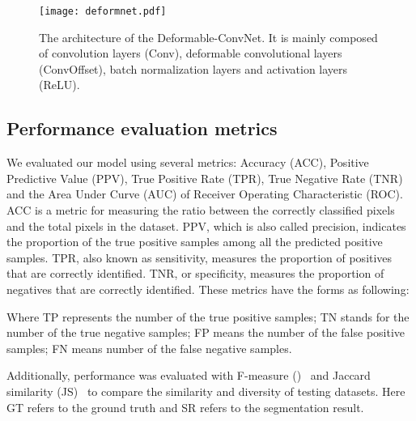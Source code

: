 \documentclass[journal]{IEEEtran}
\begin{document}
\begin{figure}
\centering
\texttt{[image: deformnet.pdf]}
\caption{The architecture of the Deformable-ConvNet. It is mainly composed of convolution layers (Conv), deformable convolutional layers (ConvOffset), batch normalization layers and activation layers (ReLU).
}
\label{fig:deformnet}
\end{figure}


\subsection{Performance evaluation metrics}
We evaluated our model using several metrics: Accuracy (ACC), Positive Predictive Value (PPV), True Positive Rate (TPR), True Negative Rate (TNR) and the Area Under Curve (AUC) of Receiver Operating Characteristic (ROC). ACC is a metric for measuring the ratio between the correctly classified pixels and the total pixels in the dataset. PPV, which is also called precision, indicates the proportion of the true positive samples among all the predicted positive samples. TPR, also known as sensitivity, measures the proportion of positives that are correctly identified. TNR, or specificity, measures the proportion of negatives that are correctly identified. These metrics have the forms as following:

\setlength{\abovedisplayshortskip}{0pt}
\setlength{\belowdisplayshortskip}{0pt}


\setlength{\abovedisplayshortskip}{0pt}
\setlength{\belowdisplayshortskip}{0pt}


\setlength{\abovedisplayshortskip}{0pt}
\setlength{\belowdisplayshortskip}{0pt}


\setlength{\abovedisplayshortskip}{0pt}
\setlength{\belowdisplayshortskip}{0pt}



Where TP represents the number of the true positive samples; TN stands for the number of the true negative samples; FP means the number of the false positive samples; FN means number of the false negative samples.

Additionally, performance was evaluated with F-measure ()~\cite{sasaki_truth_2007} and Jaccard similarity (JS)~\cite{jaccard_distribution_1901} to compare the similarity and diversity of testing datasets. Here GT refers to the ground truth and SR refers to the segmentation result.
\setlength{\abovedisplayshortskip}{0pt}
\setlength{\belowdisplayshortskip}{0pt}


\setlength{\abovedisplayshortskip}{0pt}
\setlength{\belowdisplayshortskip}{0pt}
\end{document}
